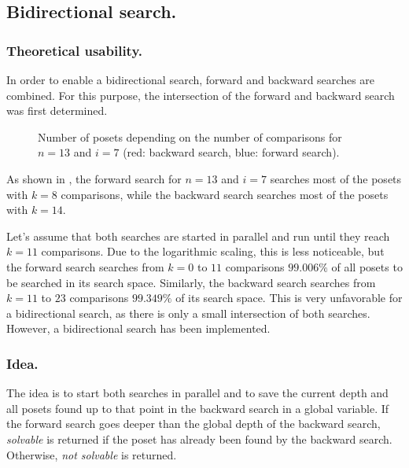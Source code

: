 \documentclass[twoside,leqno,twocolumn]{article}
\begin{document}
\subsection{Bidirectional search.} \label{sec:bidirectional}

\subsubsection{Theoretical usability.}

In order to enable a bidirectional search, forward and backward searches are combined.
For this purpose, the intersection of the forward and backward search was first determined.

\begin{figure}[!b]
  \centering
  
  \caption{Number of posets depending on the number of comparisons for $n = 13$ and $i = 7$ (red: backward search, blue: forward search).}
  \label{fig:backward_forward_count_13_6}
\end{figure}

As shown in , the forward search for $n = 13$ and $i = 7$ searches most of the posets with $k = 8$ comparisons, while the backward search searches most of the posets with $k = 14$.

Let's assume that both searches are started in parallel and run until they reach $k = 11$ comparisons.
Due to the logarithmic scaling, this is less noticeable, but the forward search searches from $k = 0$ to $11$ comparisons $99.006\%$ of all posets to be searched in its search space.
Similarly, the backward search searches from $k = 11$ to $23$ comparisons $99.349\%$ of its search space.
This is very unfavorable for a bidirectional search, as there is only a small intersection of both searches.
However, a bidirectional search has been implemented.

\subsubsection{Idea.}

The idea is to start both searches in parallel and to save the current depth and all posets found up to that point in the backward search in a global variable.
If the forward search goes deeper than the global depth of the backward search, \textit{solvable} is returned if the poset has already been found by the backward search.
Otherwise, \textit{not solvable} is returned.
\end{document}

